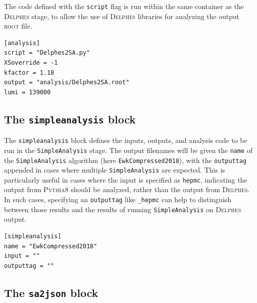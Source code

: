 \documentclass{article}
\newcommand{\simpleanalysis}{\texttt{SimpleAnalysis}}
\newcommand{\pythia}{\textsc{Pythia8}}
\newcommand{\delphes}{\textsc{Delphes}}
\newcommand{\ROOT}{\textsc{root}}
\newcommand{\toml}{\textsc{toml}}
\begin{document}
The code defined with the \texttt{script} flag is run within the same container as the \delphes{} stage, to allow the use of \delphes{} libraries for analyzing the output \ROOT{} file.

\begin{listing}[H]
	\begin{verbatim}
[analysis]
script = "Delphes2SA.py"
XSoverride = -1
kfactor = 1.18
output = "analysis/Delphes2SA.root"
lumi = 139000
        \end{verbatim}
	\caption{The \texttt{analysis} block of an example \toml{} configuration file for generating slepton events.}
	\label{slepton-config-analysis}
\end{listing}

\subsection{The \texttt{simpleanalysis} block}
\label{ssec:the-simpleanalysis-block}

The \texttt{simpleanalysis} block defines the inputs, outputs, and analysis code to be run in the \simpleanalysis{} stage.  The output filenames will be given the \texttt{name} of the \simpleanalysis{} algorithm (here \texttt{EwkCompressed2018}), with the \texttt{outputtag} appended in cases where multiple \simpleanalysis{} are expected.  This is particularly useful in cases where the input is specified as \texttt{hepmc}, indicating the output from \pythia{} should be analyzed, rather than the output from \delphes.  In such cases, specifying an \texttt{outputtag} like \texttt{\_hepmc} can help to distinguish between those results and the results of running \simpleanalysis{} on \delphes{} output.

\begin{listing}[H]
	\begin{verbatim}
[simpleanalysis]
name = "EwkCompressed2018"
input = ""
outputtag = ""
        \end{verbatim}
	\caption{The \texttt{simpleanalysis} block of an example \toml{} configuration file for generating slepton events.}
	\label{slepton-config-sa}
\end{listing}

\subsection{The \texttt{sa2json} block}
\label{ssec:the-sa2json-block}
\end{document}
